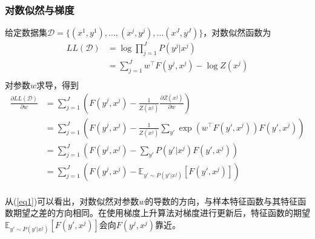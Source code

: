 \documentclass[a4paper,UTF8]{article}
\numberwithin{equation}{section}
\begin{document}
\subsubsection{对数似然与梯度}
\par 给定数据集$\mathcal{D}=\{(x^{1}, y^{1}), ..., (x^{j}, y^{j}), ...(x^{J}, y^{J})\}$，对数似然函数为
\begin{equation}\label{eq0}
\begin{aligned}
    LL(\mathcal{D})&= \log \prod_{j=1}^J P(y^{j}|x^{j})\\
    &=\sum_{j=1}^Jw^\top F(y^{j}, x^{j})-\log Z(x^{j})\\
\end{aligned}
\end{equation}
对参数$w$求导，得到
\begin{equation}\label{eq1}
\begin{aligned}
    \frac {\partial LL(\mathcal{D})}{\partial w} &= \sum_{j=1}^J\left(F(y^j, x^j)-\frac 1{Z(x^j)}\frac {\partial Z(x^j)}{\partial w}\right)\\
    &=\sum_{j=1}^J\left(F(y^j, x^j)-\frac 1{Z(x^j)}\sum_{y'}\exp(w^\top F(y', x^j))F(y', x^j)\right)\\
    &=\sum_{j=1}^J\left(F(y^j, x^j)-\sum_{y'}P(y'|x^j)F(y', x^j)\right)\\
    &=\sum_{j=1}^J\left(F(y^j, x^j)-\mathbb{E}_{y'\sim P(y'|x^j)}\left[F(y', x^j)\right]\right)\\
\end{aligned}
\end{equation}
\par 从(\ref{eq1})可以看出，对数似然对参数$w$的导数的方向，与样本特征函数与其特征函数期望之差的方向相同。在使用梯度上升算法对梯度进行更新后，特征函数的期望$\mathbb{E}_{y'\sim P(y'|x^j)}\left[F(y', x^j)\right]$会向$F(y^j, x^j)$靠近。
\end{document}
